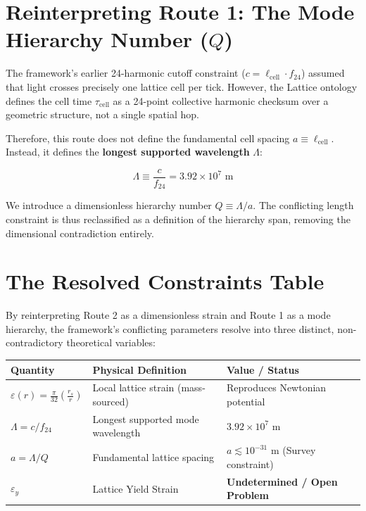 \documentclass[11pt, letterpaper, openany]{book}
\begin{document}
\section{Reinterpreting Route 1: The Mode Hierarchy Number ($Q$)}

The framework's earlier 24-harmonic cutoff constraint ($c = \ell_{\text{cell}} \cdot f_{24}$) assumed that light crosses precisely one lattice cell per tick. However, the Lattice ontology defines the cell time $\tau_{\text{cell}}$ as a 24-point collective harmonic checksum over a geometric structure, not a single spatial hop. 

Therefore, this route does not define the fundamental cell spacing $a \equiv \ell_{\text{cell}}$. Instead, it defines the \textbf{longest supported wavelength} $\Lambda$:

\[
\Lambda \equiv \frac{c}{f_{24}} = 3.92 \times 10^7 \text{ m}
\]

We introduce a dimensionless hierarchy number $Q \equiv \Lambda / a$. The conflicting length constraint is thus reclassified as a definition of the hierarchy span, removing the dimensional contradiction entirely.

\section{The Resolved Constraints Table}

By reinterpreting Route 2 as a dimensionless strain and Route 1 as a mode hierarchy, the framework's conflicting parameters resolve into three distinct, non-contradictory theoretical variables:

\vspace{0.3cm}
\begin{center}
\renewcommand{\arraystretch}{1.5}
\begin{tabular}{|l|l|l|}
\hline
\rowcolor{kishblue!12}
\textbf{Quantity} & \textbf{Physical Definition} & \textbf{Value / Status} \\
\hline
$\varepsilon(r) = \frac{\pi}{32} \left(\frac{r_s}{r}\right)$ & Local lattice strain (mass-sourced) & Reproduces Newtonian potential \\
\hline
$\Lambda = c/f_{24}$ & Longest supported mode wavelength & $3.92 \times 10^7$ m \\
\hline
$a = \Lambda/Q$ & Fundamental lattice spacing & $a \lesssim 10^{-31}$ m (Survey constraint) \\
\hline
$\varepsilon_y$ & Lattice Yield Strain & \textbf{Undetermined / Open Problem} \\
\hline
\end{tabular}
\end{center}
\vspace{0.3cm}
\end{document}
